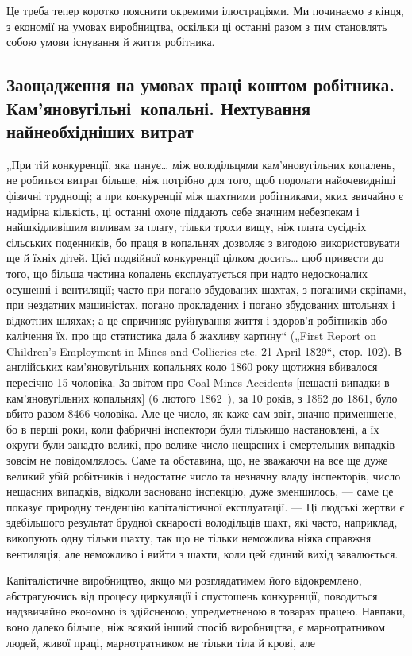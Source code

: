 
Це треба тепер коротко пояснити окремими ілюстраціями.
Ми починаємо з кінця, з економії на умовах виробництва,
оскільки ці останні разом з тим становлять собою умови існування й життя робітника.

\subsection[%
Заощадження на умовах праці коштом робітника]{%
Заощадження на умовах праці коштом робітника. Кам’яновугільні~копальні. Нехтування найнеобхідніших витрат}

„При тій конкуренції, яка панує\dots{} між володільцями кам’яновугільних копалень, не робиться витрат
більше, ніж потрібно
для того, щоб подолати найочевидніші фізичні труднощі; а при
конкуренції між шахтними робітниками, яких звичайно є надмірна кількість, ці останні охоче піддають
себе значним небезпекам і найшкідливішим впливам за плату, тільки трохи вищу,
ніж плата сусідніх сільських поденників, бо праця в копальнях
дозволяє з вигодою використовувати ще й їхніх дітей. Цієї подвійної конкуренції цілком досить\dots{} щоб
привести до того, що
більша частина копалень експлуатується при надто недосконалих осушенні і вентиляції; часто при
погано збудованих шахтах,
з поганими скріпами, при нездатних машиністах, погано прокладених і погано збудованих штольнях і
відкотних шляхах; а це спричиняє руйнування життя і здоров’я робітників або калічення їх,
про що статистика дала б жахливу картину“ („First Report
on Children’s Employment in Mines and Collieries etc. 21 April
1829“, стор. 102). В англійських кам’яновугільних копальнях коло
1860 року щотижня вбивалося пересічно 15 чоловіка. За звітом
про Coal Mines Accidents [нещасні випадки в кам’яновугільних
копальнях] (6 лютого 1862~), за 10 років, з 1852 до 1861,
було вбито разом 8466 чоловіка. Але це число, як каже сам
звіт, значно применшене, бо в перші роки, коли фабричні інспектори були тількищо настановлені, а їх
округи були занадто
великі, про велике число нещасних і смертельних випадків зовсім не повідомлялось. Саме та обставина,
що, не зважаючи на
все ще дуже великий убій робітників і недостатнє число та
незначну владу інспекторів, число нещасних випадків, відколи
засновано інспекцію, дуже зменшилось, — саме це показує природну тенденцію капіталістичної
експлуатації. — Ці людські
жертви є здебільшого результат брудної скнарості володільців
шахт, які часто, наприклад, викопують одну тільки шахту, так
що не тільки неможлива ніяка справжня вентиляція, але неможливо і вийти з шахти, коли цей єдиний
вихід завалюється.

Капіталістичне виробництво, якщо ми розглядатимем його
відокремлено, абстрагуючись від процесу циркуляції і спустошень конкуренції, поводиться надзвичайно
економно із здійсненою, упредметненою в товарах працею. Навпаки, воно далеко
більше, ніж всякий інший спосіб виробництва, є марнотратником
людей, живої праці, марнотратником не тільки тіла й крові, але
\parbreak{}  %
